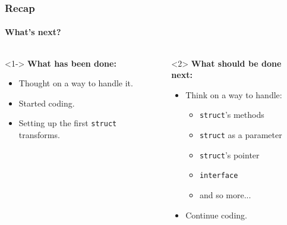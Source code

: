 \begin{frame}
  \frametitle{Recap}
  \framesubtitle{What's next?}

  \begin{columns}
    \begin{column}{0.5\textwidth}<1->
      \textbf{What has been done:}
      \begin{itemize}
        \item Thought on a way to handle it.
        \item Started coding.
        \item Setting up the first \texttt{struct} transforms.
      \end{itemize}
    \end{column}
    \begin{column}{0.5\textwidth}<2>
      \textbf{What should be done next:}
      \begin{itemize}
        \item Think on a way to handle:
          \begin{itemize}
            \item \texttt{struct}'s methods
            \item \texttt{struct} as a parameter
            \item \texttt{struct}'s pointer
            \item \texttt{interface}
            \item and so more...
          \end{itemize}
        \item Continue coding.
      \end{itemize}
    \end{column}
  \end{columns}
\end{frame}
